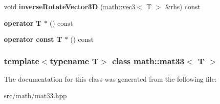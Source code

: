 \begin{DoxyCompactItemize}
\item 
\hypertarget{classmath_1_1mat33_aaa5aa7bf812c1edf162c90a937f77d92}{
void {\bfseries inverseRotateVector3D} (\hyperlink{classmath_1_1vec3}{math::vec3}$<$ T $>$ \&rhs) const }
\label{classmath_1_1mat33_aaa5aa7bf812c1edf162c90a937f77d92}

\item 
\hypertarget{classmath_1_1mat33_ad1b3ef329d70bffaae957a7e871ea29a}{
{\bfseries operator T $\ast$} () const }
\label{classmath_1_1mat33_ad1b3ef329d70bffaae957a7e871ea29a}

\item 
\hypertarget{classmath_1_1mat33_a727616b6c5fa235e4e48b61e41996fb1}{
{\bfseries operator const T $\ast$} () const }
\label{classmath_1_1mat33_a727616b6c5fa235e4e48b61e41996fb1}

\end{DoxyCompactItemize}
\subsubsection*{template$<$typename T$>$ class math::mat33$<$ T $>$}



The documentation for this class was generated from the following file:\begin{DoxyCompactItemize}
\item 
src/math/mat33.hpp\end{DoxyCompactItemize}
